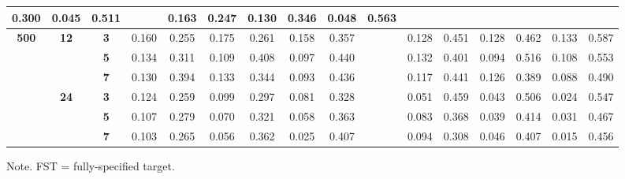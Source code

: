 \documentclass[a4paper,man,natbib]{apa6}
\begin{document}
\begin{table}[]
{\begin{tabular}{cccccccccccccccc}
			0.300 &
			0.045 &
			0.511 &
			&
			0.163 &
			0.247 &
			0.130 &
			0.346 &
			0.048 &
			0.563 \\ \hline
			\multirow{6}{*}{\textbf{500}} &
			\multirow{3}{*}{\textbf{12}} &
			\textbf{3} &
			0.160 &
			0.255 &
			0.175 &
			0.261 &
			0.158 &
			0.357 &
			&
			0.128 &
			0.451 &
			0.128 &
			0.462 &
			0.133 &
			0.587 \\ \cline{3-16} 
			&
			&
			\textbf{5} &
			0.134 &
			0.311 &
			0.109 &
			0.408 &
			0.097 &
			0.440 &
			&
			0.132 &
			0.401 &
			0.094 &
			0.516 &
			0.108 &
			0.553 \\ \cline{3-16} 
			&
			&
			\textbf{7} &
			0.130 &
			0.394 &
			0.133 &
			0.344 &
			0.093 &
			0.436 &
			&
			0.117 &
			0.441 &
			0.126 &
			0.389 &
			0.088 &
			0.490 \\ \cline{2-16} 
			&
			\multirow{3}{*}{\textbf{24}} &
			\textbf{3} &
			0.124 &
			0.259 &
			0.099 &
			0.297 &
			0.081 &
			0.328 &
			&
			0.051 &
			0.459 &
			0.043 &
			0.506 &
			0.024 &
			0.547 \\ \cline{3-16} 
			&
			&
			\textbf{5} &
			0.107 &
			0.279 &
			0.070 &
			0.321 &
			0.058 &
			0.363 &
			&
			0.083 &
			0.368 &
			0.039 &
			0.414 &
			0.031 &
			0.467 \\ \cline{3-16} 
			&
			&
			\textbf{7} &
			0.103 &
			0.265 &
			0.056 &
			0.362 &
			0.025 &
			0.407 &
			&
			0.094 &
			0.308 &
			0.046 &
			0.407 &
			0.015 &
			0.456 \\ \hline
		\end{tabular}%
	}
	\begin{tablenotes}[flushleft]
		\small
		\item 	Note. FST = fully-specified target.
	\end{tablenotes}
\end{table}
\end{document}
